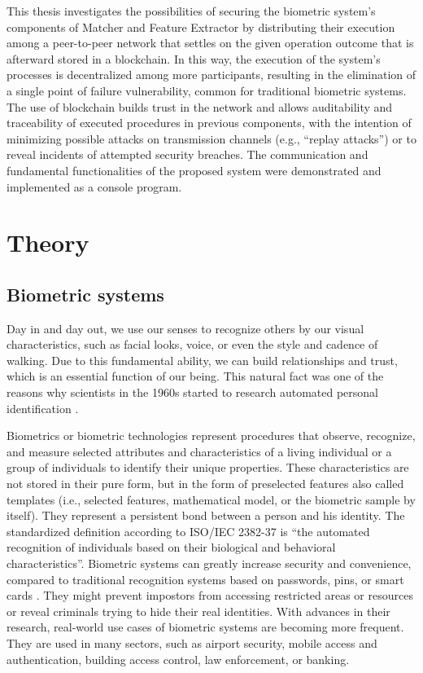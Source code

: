 This thesis investigates the possibilities of securing the biometric system's components of Matcher and Feature Extractor by distributing their execution among a peer-to-peer network that settles on the given operation outcome that is afterward stored in a blockchain. In this way, the execution of the system's processes is decentralized among more participants, resulting in the elimination of a single point of failure vulnerability, common for traditional biometric systems. The use of blockchain builds trust in the network and allows auditability and traceability of executed procedures in previous components, with the intention of minimizing possible attacks on transmission channels (e.g., ``replay attacks'') or to reveal incidents of attempted security breaches. The communication and fundamental functionalities of the proposed system were demonstrated and implemented as a console program.


\chapter{Theory}
\section{Biometric systems}
\label{Biometric systems}
Day in and day out, we use our senses to recognize others by our visual characteristics, such as facial looks, voice, or even the style and cadence of walking. Due to this fundamental ability, we can build relationships and trust, which is an essential function of our being. This natural fact was one of the reasons why scientists in the 1960s started to research automated personal identification \cite{biometricsHistory}.

Biometrics or biometric technologies represent procedures that observe, recognize, and measure selected attributes and characteristics of a living individual or a group of individuals to identify their unique properties. These characteristics are not stored in their pure form, but in the form of preselected features also called templates (i.e., selected features, mathematical model, or the biometric sample by itself). They represent a persistent bond between a person and his identity. The standardized definition according to ISO/IEC 2382-37 \cite{isoBiometricSystem} is ``the automated recognition of individuals based on their biological and behavioral characteristics''.
Biometric systems can greatly increase security and convenience, compared to traditional recognition systems based on passwords, pins, or smart cards \cite{BiometricRecognitionSecurity}. They might prevent impostors from accessing restricted areas or resources or reveal criminals trying to hide their real identities. With advances in their research, real-world use cases of biometric systems are becoming more frequent. They are used in many sectors, such as airport security, mobile access and authentication, building access control, law enforcement, or banking.

